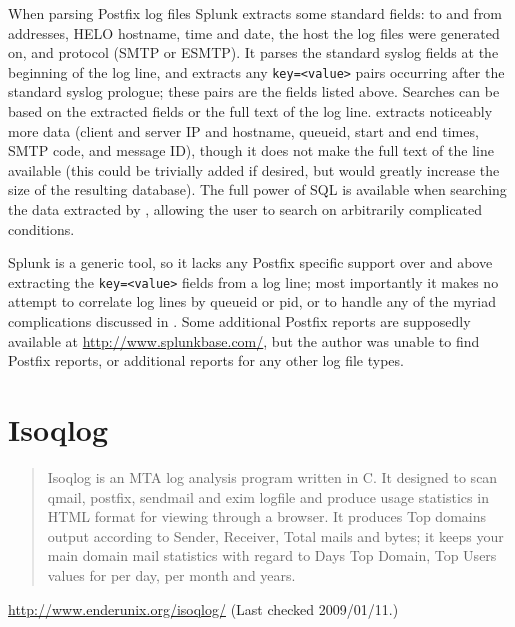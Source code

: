 When parsing Postfix log files Splunk extracts some standard fields: to and
from addresses, HELO hostname, time and date, the host the log files were
generated on, and protocol (\gls{SMTP} or \gls{ESMTP}).  It parses the
standard syslog fields at the beginning of the log line, and
extracts any \texttt{key=<value>} pairs occurring after the standard syslog
prologue; these pairs are the fields listed above.  Searches can be based
on the extracted fields or the full text of the log line.  \parsername{}
extracts noticeably more data (client and server \gls{IP} and hostname,
queueid, start and end times, \gls{SMTP} code, and message ID), though it
does not make the full text of the line available (this could be trivially
added if desired, but would greatly increase the size of the resulting
database).  The full power of \gls{SQL} is available when searching the
data extracted by \parsername{}, allowing the user to search on arbitrarily
complicated conditions.

Splunk is a generic tool, so it lacks any Postfix specific support over and
above extracting the \texttt{key=<value>} fields from a log line; most
importantly it makes no attempt to correlate log lines by queueid or
\gls{pid}, or to handle any of the myriad complications discussed in
.  Some additional Postfix reports are supposedly
available at \url{http://www.splunkbase.com/}, but the author was unable to
find Postfix reports, or additional reports for any other log file types.

\section{Isoqlog}

\begin{quotation}

    Isoqlog is an MTA log analysis program written in C. It designed to
    scan qmail, postfix, sendmail and exim logfile and produce usage
    statistics in HTML format for viewing through a browser. It produces
    Top domains output according to Sender, Receiver, Total mails and
    bytes; it keeps your main domain mail statistics with regard to Days
    Top Domain, Top Users values for per day, per month and years.

\end{quotation}

\noindent{}\url{http://www.enderunix.org/isoqlog/} \newline{}
(Last checked 2009/01/11.)


